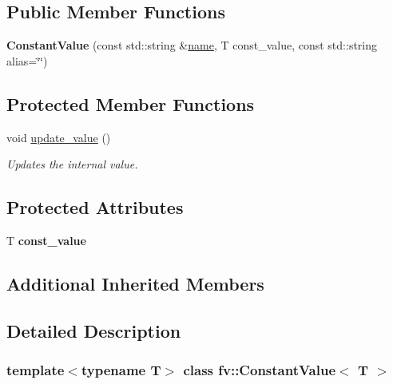 \subsection*{Public Member Functions}
\begin{DoxyCompactItemize}
\item 
\hypertarget{classfv_1_1ConstantValue_a82512bd0a0505bcf69816fa8b3305c29}{}\label{classfv_1_1ConstantValue_a82512bd0a0505bcf69816fa8b3305c29} 
{\bfseries Constant\+Value} (const std\+::string \&\hyperlink{classfv_1_1GenValue_a610f89ee441eaad4c9e78f74d6bde93b}{name}, T const\+\_\+value, const std\+::string alias=\char`\"{}\char`\"{})
\end{DoxyCompactItemize}
\subsection*{Protected Member Functions}
\begin{DoxyCompactItemize}
\item 
void \hyperlink{classfv_1_1ConstantValue_a6581e7fb69c082c07c9714138063b320}{update\+\_\+value} ()
\begin{DoxyCompactList}\small\item\em Updates the internal value. \end{DoxyCompactList}\end{DoxyCompactItemize}
\subsection*{Protected Attributes}
\begin{DoxyCompactItemize}
\item 
\hypertarget{classfv_1_1ConstantValue_a7bd409365b0f9a271a865d7d7abf1648}{}\label{classfv_1_1ConstantValue_a7bd409365b0f9a271a865d7d7abf1648} 
T {\bfseries const\+\_\+value}
\end{DoxyCompactItemize}
\subsection*{Additional Inherited Members}


\subsection{Detailed Description}
\subsubsection*{template$<$typename T$>$\newline
class fv\+::\+Constant\+Value$<$ T $>$}

